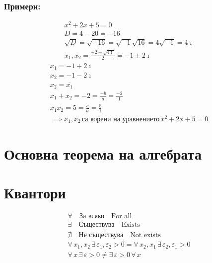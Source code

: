 \documentclass{article}
\begin{document}
    \subsubsection{Примери:}
    \begin{align*}
        x^2 + 2x + 5 = 0\\
        D = 4 - 20 = -16\\
        \sqrt{D} = \sqrt{-16} = \sqrt{-1}\sqrt{16} = 4\sqrt{-1} = 4 \imath\\
        x_1, x_2 = \frac{-2 \pm \sqrt{4 \imath}}{2} = -1 \pm 2 \imath
    \end{align*}
    \begin{align*}
        x_1 = -1 + 2 \imath\\
        x_2 = -1 - 2 \imath\\
        x_2 = \overline{x_1}\\
        x_1 + x_2 = -2 = \frac{-b}{a} = \frac{-2}{1}\\
        x_1 x_2 = 5 = \frac{c}{a} = \frac{5}{1}\\
        \implies x_1, x_2 \, \text{са корени на уравнението} \, x^2 + 2x + 5 = 0
    \end{align*}
    \section{Основна теорема на алгебрата}

    \section{Квантори}
    \begin{align*}
        \forall \quad \text{За всяко} \quad \text{For all}\\
        \exists \quad \text{Съществува} \quad \text{Exists}\\
        \nexists \quad \text{Не съществува} \quad \text{Not exists}\\
        \forall \, x_1, x_2 \, \exists \, \varepsilon_1, \varepsilon_2 > 0 = \forall \, x_2, x_1 \, \exists \, \varepsilon_2, \varepsilon_1 > 0\\
        \forall \, x \, \exists \, \varepsilon > 0 \neq \exists \, \varepsilon > 0 \, \forall \, x
    \end{align*}
\end{document}
